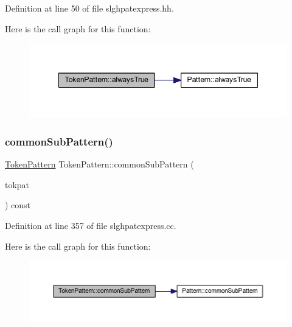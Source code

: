 Definition at line 50 of file slghpatexpress.\+hh.

Here is the call graph for this function\+:
\nopagebreak
\begin{figure}[H]
\begin{center}
\leavevmode
\includegraphics[width=348pt]{class_token_pattern_a0a1c7d3ae8b9964908decdcd5c8e2e47_cgraph}
\end{center}
\end{figure}
\mbox{\label{class_token_pattern_abdd5d386c2262819c8423bb4454e3e70}} 
\subsubsection{\texorpdfstring{commonSubPattern()}{commonSubPattern()}}
{\footnotesize\ttfamily \mbox{\hyperlink{class_token_pattern}{Token\+Pattern}} Token\+Pattern\+::common\+Sub\+Pattern (\begin{DoxyParamCaption}\item[{const \mbox{\hyperlink{class_token_pattern}{Token\+Pattern}} \&}]{tokpat }\end{DoxyParamCaption}) const}



Definition at line 357 of file slghpatexpress.\+cc.

Here is the call graph for this function\+:
\nopagebreak
\begin{figure}[H]
\begin{center}
\leavevmode
\includegraphics[width=350pt]{class_token_pattern_abdd5d386c2262819c8423bb4454e3e70_cgraph}
\end{center}
\end{figure}
\mbox{\label{class_token_pattern_a6d07795355a0042e823853489b30e32c}} 
